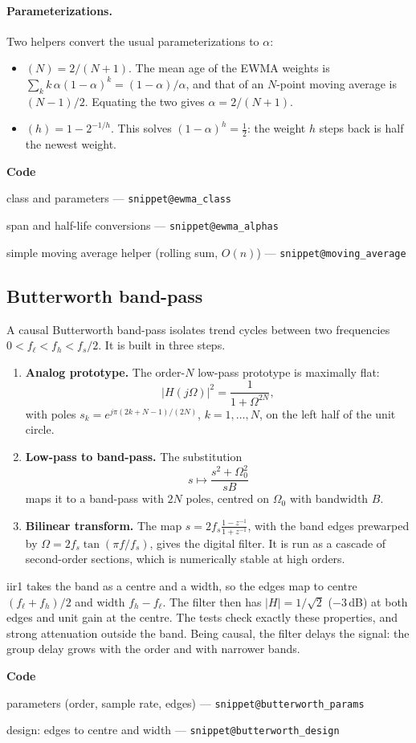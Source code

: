 \documentclass[11pt,a4paper]{article}
\makeatletter
\newcommand{\snippetsource}[1]{\csname snippet@#1\endcsname}
\newcommand{\snippet}[3]{%
  }
\newenvironment{codepointers}{%
  \par\smallskip\begingroup\footnotesize\noindent\textcolor{blue!50!black}{\textbf{Code}}\par\nopagebreak
  \begin{list}{}{\setlength{\leftmargin}{1.2em}\setlength{\itemsep}{0pt}\setlength{\parsep}{0pt}\setlength{\topsep}{1pt}}}%
  {\end{list}\endgroup\smallskip}
\newcommand{\codeitem}[2]{\item #2 --- \texttt{\snippetsource{#1}}}
\makeatother
\begin{document}
\paragraph{Parameterizations.} Two helpers convert the usual parameterizations to $\alpha$:
\begin{itemize}
  \item {}$(N)=2/(N+1)$. The mean age of the EWMA weights is
        $\sum_k k\,\alpha(1-\alpha)^k=(1-\alpha)/\alpha$, and that of an $N$-point moving
        average is $(N-1)/2$. Equating the two gives $\alpha=2/(N+1)$.
  \item {}$(h)=1-2^{-1/h}$. This solves $(1-\alpha)^h=\tfrac12$:
        the weight $h$ steps back is half the newest weight.
\end{itemize}

\snippet{ewma_impl}{C++}{EWMA on iir1's one-pole section, with first-sample seeding}
\begin{codepointers}
  \codeitem{ewma_class}{class and parameters}
  \codeitem{ewma_alphas}{span and half-life conversions}
  \codeitem{moving_average}{simple moving average helper (rolling sum, $O(n)$)}
\end{codepointers}

\subsection{Butterworth band-pass}
A causal Butterworth band-pass isolates trend cycles between two frequencies
$0<f_\ell<f_h<f_s/2$. It is built in three steps.
\begin{enumerate}
  \item \textbf{Analog prototype.} The order-$N$ low-pass prototype is maximally flat:
        \[
          |H(j\Omega)|^2=\frac{1}{1+\Omega^{2N}},
        \]
        with poles $s_k=e^{j\pi(2k+N-1)/(2N)}$, $k=1,\dots,N$, on the left half of the unit
        circle.
  \item \textbf{Low-pass to band-pass.} The substitution
        \[
          s\mapsto\frac{s^2+\Omega_0^2}{sB}
        \]
        maps it to a band-pass with $2N$ poles, centred on $\Omega_0$ with bandwidth $B$.
  \item \textbf{Bilinear transform.} The map $s=2f_s\frac{1-z^{-1}}{1+z^{-1}}$, with the band
        edges prewarped by $\Omega=2f_s\tan(\pi f/f_s)$, gives the digital filter. It is run
        as a cascade of second-order sections, which is numerically stable at high orders.
\end{enumerate}
iir1 takes the band as a centre and a width, so the edges map to centre
$(f_\ell+f_h)/2$ and width $f_h-f_\ell$. The filter then has $|H|=1/\sqrt2$ ($-3$\,dB)
at both edges and unit gain at the centre. The tests check exactly these properties, and
strong attenuation outside the band. Being causal, the filter delays the signal: the
group delay grows with the order and with narrower bands.
\begin{codepointers}
  \codeitem{butterworth_params}{parameters (order, sample rate, edges)}
  \codeitem{butterworth_design}{design: edges to centre and width}
\end{codepointers}
\end{document}
